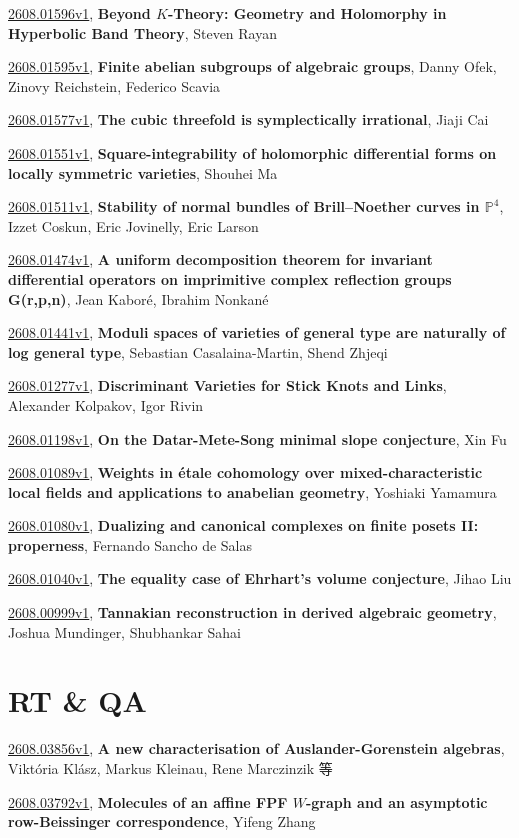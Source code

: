 \documentclass[9pt, a4paper]{article}
\theoremstyle{plain}
\theoremstyle{definition}
\theoremstyle{remark}
\newcommand{\arxiv}[3]{\href{https://arxiv.org/abs/#1}{#1}, \textbf{\textcolor{arxivblue}{#2}}, #3}
\begin{document}
\arxiv{2608.01596v1}{Beyond $K$-Theory: Geometry and Holomorphy in Hyperbolic Band Theory}{Steven Rayan}

\arxiv{2608.01595v1}{Finite abelian subgroups of algebraic groups}{Danny Ofek, Zinovy Reichstein, Federico Scavia}

\arxiv{2608.01577v1}{The cubic threefold is symplectically irrational}{Jiaji Cai}

\arxiv{2608.01551v1}{Square-integrability of holomorphic differential forms on locally symmetric varieties}{Shouhei Ma}

\arxiv{2608.01511v1}{Stability of normal bundles of Brill--Noether curves in $\mathbb{P}^4$}{Izzet Coskun, Eric Jovinelly, Eric Larson}

\arxiv{2608.01474v1}{A uniform decomposition theorem for invariant differential operators on imprimitive complex reflection groups G(r,p,n)}{Jean Kaboré, Ibrahim Nonkané}

\arxiv{2608.01441v1}{Moduli spaces of varieties of general type are naturally of log general type}{Sebastian Casalaina-Martin, Shend Zhjeqi}

\arxiv{2608.01277v1}{Discriminant Varieties for Stick Knots and Links}{Alexander Kolpakov, Igor Rivin}

\arxiv{2608.01198v1}{On the Datar-Mete-Song minimal slope conjecture}{Xin Fu}

\arxiv{2608.01089v1}{Weights in étale cohomology over mixed-characteristic local fields and applications to anabelian geometry}{Yoshiaki Yamamura}

\arxiv{2608.01080v1}{Dualizing and canonical complexes on finite posets II: properness}{Fernando Sancho de Salas}

\arxiv{2608.01040v1}{The equality case of Ehrhart's volume conjecture}{Jihao Liu}

\arxiv{2608.00999v1}{Tannakian reconstruction in derived algebraic geometry}{Joshua Mundinger, Shubhankar Sahai}


\section{RT \& QA}
\arxiv{2608.03856v1}{A new characterisation of Auslander-Gorenstein algebras}{Viktória Klász, Markus Kleinau, Rene Marczinzik 等}

\arxiv{2608.03792v1}{Molecules of an affine FPF $W$-graph and an asymptotic row-Beissinger correspondence}{Yifeng Zhang}
\end{document}
